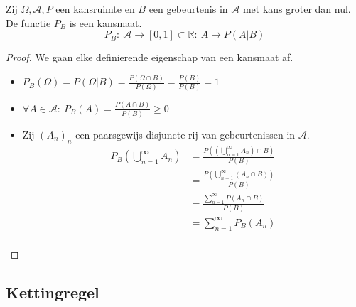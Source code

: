 \documentclass[main.tex]{subfiles}
\begin{document}
\begin{st}
  Zij $\Omega,\mathcal{A},P$ een kansruimte en $B$ een gebeurtenis in $\mathcal{A}$ met kans groter dan nul.
  De functie $P_{B}$ is een kansmaat.
  \[ P_{B}:\ \mathcal{A} \rightarrow [0,1] \subset \mathbb{R}:\ A \mapsto P(A|B) \]

  \begin{proof}
    We gaan elke definierende eigenschap van een kansmaat af.
    \begin{itemize}
    \item $P_{B}(\Omega) = P(\Omega|B) = \frac{P(\Omega \cap B)}{P(\Omega)} = \frac{P(B)}{P(B)} = 1$
    \item $\forall A \in \mathcal{A}:\ P_{B}(A) = \frac{P(A\cap B)}{P(B)} \ge 0$
    \item Zij $(A_{n})_{n}$ een paarsgewijs disjuncte rij van gebeurtenissen in $\mathcal{A}$.
      \[
      \begin{array}{rl}
        P_{B}\left( \bigcup_{n=1}^{\infty} A_{n} \right)
        &= \frac{P\left(\left( \bigcup_{n=1}^{\infty} A_{n} \right) \cap B \right)}{P(B)}\\
        &= \frac{P\left(\bigcup_{n=1}^{\infty} (A_{n} \cap B)\right)}{P(B)}\\
        &= \frac{\sum_{n=1}^{\infty}P\left(A_{n} \cap B\right)}{P(B)}\\
        &= \sum_{n=1}^{\infty}P_{B}(A_{n})\\
      \end{array}
      \]
    \end{itemize}
  \end{proof}
\end{st}

\subsection{Kettingregel}
\label{sec:kettingregel}
\end{document}

